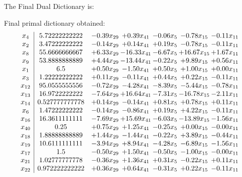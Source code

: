 \documentclass[8pt]{article}
\begin{document}
The Final Dual Dictionary is: 

 Final primal dictionary obtained: 
\[\begin{array}{c| c c@{\hskip 2pt} c@{\hskip 2pt} c@{\hskip 2pt} c@{\hskip 2pt} c@{\hskip 2pt} }
 x_{4}   &  5.72222222222 & -0.39 x_{29} & +  0.39 x_{41} & -0.06 x_{5} & -0.78 x_{15} & -0.11 x_{11}\\
 x_{2}   &  3.47222222222 & -0.14 x_{29} & +  0.14 x_{41} & +  0.19 x_{5} & -0.78 x_{15} & -0.11 x_{11}\\
 x_{8}   &  55.6666666667 & +  6.33 x_{29} & -16.33 x_{41} & -6.67 x_{5} & + 16.67 x_{15} & +  1.67 x_{11}\\
 x_{9}   &  53.8888888889 & +  4.44 x_{29} & -13.44 x_{41} & -0.22 x_{5} & +  9.89 x_{15} & +  0.56 x_{11}\\
 x_{1}   &  6.5 & +  0.50 x_{29} & -1.50 x_{41} & +  0.50 x_{5} & +  1.00 x_{15} & +  0.00 x_{11}\\
 x_{3}   &  1.22222222222 & +  0.11 x_{29} & -0.11 x_{41} & +  0.44 x_{5} & +  0.22 x_{15} & -0.11 x_{11}\\
 x_{12}   &  95.0555555556 & -0.72 x_{29} & -4.28 x_{41} & -8.39 x_{5} & -5.44 x_{15} & -0.78 x_{11}\\
 x_{13}   &  16.9722222222 & -7.64 x_{29} & + 16.64 x_{41} & -7.31 x_{5} & -16.78 x_{15} & -2.11 x_{11}\\
 x_{14}   &  0.527777777778 & +  0.14 x_{29} & -0.14 x_{41} & +  0.81 x_{5} & +  0.78 x_{15} & +  0.11 x_{11}\\
 x_{6}   &  1.47222222222 & -0.14 x_{29} & -0.86 x_{41} & +  0.19 x_{5} & +  4.22 x_{15} & -0.11 x_{11}\\
 x_{16}   &  16.3611111111 & -7.69 x_{29} & + 15.69 x_{41} & -6.03 x_{5} & -13.89 x_{15} & -1.56 x_{11}\\
 x_{40}   &  0.25 & +  0.75 x_{29} & +  1.25 x_{41} & -0.25 x_{5} & +  0.00 x_{15} & -0.00 x_{11}\\
 x_{18}   &  1.88888888889 & +  1.44 x_{29} & -1.44 x_{41} & -0.22 x_{5} & +  3.89 x_{15} & -0.44 x_{11}\\
 x_{19}   &  10.6111111111 & -3.94 x_{29} & +  8.94 x_{41} & -4.28 x_{5} & -6.89 x_{15} & -1.56 x_{11}\\
 x_{17}   &  1.5 & -0.50 x_{29} & +  1.50 x_{41} & -0.50 x_{5} & -1.00 x_{15} & -0.00 x_{11}\\
 x_{21}   &  1.02777777778 & -0.36 x_{29} & +  1.36 x_{41} & +  0.31 x_{5} & -0.22 x_{15} & +  0.11 x_{11}\\
 x_{22}   &  0.972222222222 & +  0.36 x_{29} & +  0.64 x_{41} & -0.31 x_{5} & +  0.22 x_{15} & -0.11 x_{11}\\

\end{array}\]
\end{document}
